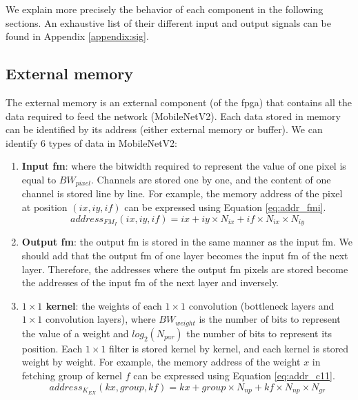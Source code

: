 We explain more precisely the behavior of each component in the following sections. An exhaustive list of their different input and output signals can be found in Appendix \ref{appendix:sig}.
%
\subsection{External memory} \label{subs:extmem}
%
The external memory is an external component (of the \acrshort{fpga}) that contains all the data required to feed the network (MobileNetV2). Each data stored in memory can be identified by its address (either external memory or buffer). We can identify 6 types of data in MobileNetV2:
%
\begin{enumerate}
    \item \textbf{Input \acrshort{fm}}: where the bitwidth required to represent the value of one pixel is equal to $BW_{pixel}$. Channels are stored one by one, and the content of one channel is stored line by line. For example, the memory address of the pixel at position $\left(ix, iy, if\right)$ can be expressed using Equation \eqref{eq:addr_fmi}.
    \begin{equation}
        address_{FM_{I}}(ix, iy, if) = ix + iy \times N_{ix} + if \times N_{ix} \times N_{iy}
        \label{eq:addr_fmi}
    \end{equation}
    \item \textbf{Output \acrshort{fm}}: the output \acrshort{fm} is stored in the same manner as the input \acrshort{fm}. We should add that the output \acrshort{fm} of one layer becomes the input \acrshort{fm} of the next layer. Therefore, the addresses where the output \acrshort{fm} pixels are stored become the addresses of the input \acrshort{fm} of the next layer and inversely.
    \item \textbf{$1 \times 1$ kernel}: the weights of each $1 \times 1$ convolution (bottleneck layers and $1 \times 1$ convolution layers), where $BW_{weight}$ is the number of bits to represent the value of a weight and $log_2(N_{par})$ the number of bits to represent its position. Each $1 \times 1$ filter is stored kernel by kernel, and each kernel is stored weight by weight. For example, the memory address of the weight $x$ in fetching group  of kernel $f$ can be expressed using Equation \eqref{eq:addr_c11}.
    \begin{equation}
        address_{K_{EX}}(kx, group, kf) = kx + group \times N_{np} + kf \times N_{np} \times N_{gr}
        \label{eq:addr_c11}
    \end{equation}

\end{enumerate}

